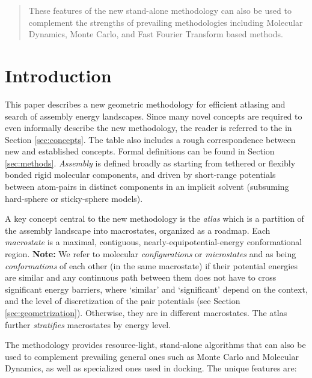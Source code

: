 \documentclass[]{article}
\newcommand{\rahul}[1]{\color{black}{#1}\color{black}}
\begin{document}
\begin{abstract}
{These features of the new stand-alone methodology can also be used to 
complement the strengths of prevailing methodologies including Molecular 
Dynamics, Monte Carlo, and Fast Fourier Transform based methods.
}
\end{abstract}

 
\section{Introduction} 
\label{sec:intro}
This paper describes a new geometric methodology for efficient atlasing and
search of assembly energy landscapes. Since many novel concepts are required to
even informally describe the new methodology, the reader is referred to the
\rahul{Table \ref{tab:terminology} } in Section \ref{sec:concepts}. The table
also includes a rough correspondence between new and established concepts.
Formal definitions can be found in Section \ref{sec:methods}. \emph{Assembly}
is defined broadly as starting from tethered or flexibly bonded rigid molecular
components, and driven by short-range potentials between atom-pairs in distinct
components in an implicit solvent (subsuming hard-sphere or sticky-sphere
models). 

A key concept central to the new methodology is the \emph{atlas} which is a
partition of the assembly landscape into macrostates, organized as a roadmap.
Each \emph{macrostate} is a maximal, contiguous, nearly-equipotential-energy
conformational region. {\bf Note:} We refer to molecular \emph{configurations}
or \emph{microstates}  and  as being \emph{conformations} of each other
(in the same macrostate) if their potential energies are similar and any
continuous path between them does not have to cross significant energy
barriers, where `similar' and `significant' depend on the context, and the
level of discretization of the pair potentials (see Section
\ref{sec:geometrization}). Otherwise, they are in different macrostates. The
atlas further \emph{stratifies} macrostates by energy level.

The methodology provides resource-light, stand-alone algorithms that can also
be used to complement prevailing general ones such as Monte Carlo and Molecular
Dynamics, as well as specialized ones used in docking. The unique features are:
\end{document}
